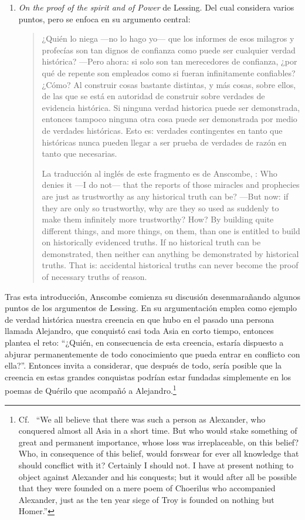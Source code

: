 \begin{enumerate}
{    las palabras de ese profeta o visionario soñador. (Dt 13, 1--4a)}
\item \emph{On the proof of the spirit and of Power} de Lessing. Del cual
  considera varios puntos, pero se enfoca en su argumento central:
  \blockquote[La traducción al inglés de este fragmento es de Anscombe,
  {\cite[Cf.~][22]{anscombe2008faith:prophandmi}}: Who denies it ---I do not---
  that the reports of those miracles and prophecies are just as trustworthy as
  any historical truth can be? ---But now: if they are only so trustworthy, why
  are they so used as suddenly to make them infinitely more trustworthy? How? By
  building quite different things, and more things, on them, than one is
  entitled to build on historically evidenced truths. If no historical truth can
  be demonstrated, then neither can anything be demonstrated by historical
  truths. That is: accidental historical truths can never become the proof of
  necessary truths of reason.]{¿Quién lo niega ---no lo hago yo--- que los
    informes de esos milagros y profecías son tan dignos de confianza como puede
    ser cualquier verdad histórica? ---Pero ahora: si solo son tan merecedores
    de confianza, ¿por qué de repente son empleados como si fueran infinitamente
    confiables? ¿Cómo? Al construir cosas bastante distintas, y más cosas, sobre
    ellos, de las que se está en autoridad de construir sobre verdades de
    evidencia histórica. Si ninguna verdad historica puede ser demonstrada,
    entonces tampoco ninguna otra cosa puede ser demonstrada por medio de
    verdades históricas. Esto es: verdades contingentes en tanto que históricas
    nunca pueden llegar a ser prueba de verdades de razón en tanto que
    necesarias.}
\end{enumerate}

Tras esta introducción, Anscombe comienza su discusión desenmarañando algunos
puntos de los argumentos de Lessing. En su argumentación emplea como ejemplo de
verdad histórica nuestra creencia en que hubo en el pasado una persona llamada
Alejandro, que conquistó casi toda Asia en corto tiempo, entonces plantea el
reto: \enquote{¿Quién, en consecuencia de esta creencia, estaría dispuesto a
  abjurar permanentemente de todo conocimiento que pueda entrar en conflicto con
  ella?}. Entonces invita a considerar, que después de todo, sería posible que
la creencia en estas grandes conquistas podrían estar fundadas simplemente en
los poemas de Quérilo que acompañó a Alejandro.\footnote{Cf.~ \enquote{We all
    believe that there was such a person as Alexander, who conquered almost all
    Asia in a short time. But who would stake something of great and permanent
    importance, whose loss was irreplaceable, on this belief? Who, in
    consequence of this belief, would forswear for ever all knowledge that
    should concflict with it? Certainly I should not. I have at present nothing
    to object against Alexander and his conquests; but it would after all be
    possible that they were founded on a mere poem of Choerilus who accompanied
    Alexander, just as the ten year siege of Troy is founded on nothing but
    Homer.}}

